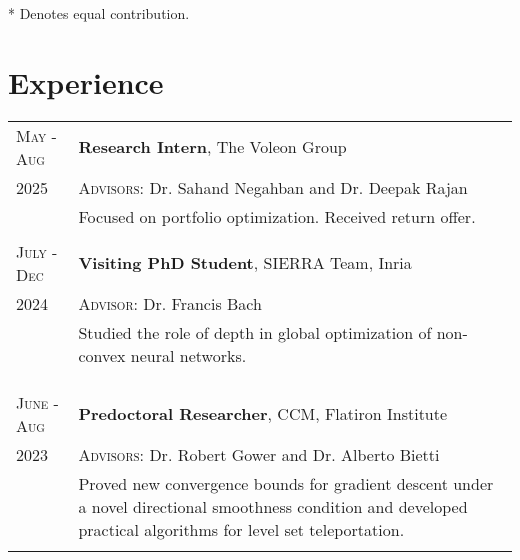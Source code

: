 \documentclass[10pt]{article}
\newcommand{\spacing}{\vspace{0.5cm}}
\begin{document}
* Denotes equal contribution.

\spacing

\section{Experience}
\begin{longtable}
    {R{1.8cm}|L{11.8cm}}
    \textsc{May - Aug} & \textbf{Research Intern}, The Voleon Group                                                  \\
    2025                &  \textsc{Advisors:} Dr. Sahand Negahban and Dr. Deepak Rajan                                                                                                            \\                  & {\small Focused on portfolio optimization. Received return offer.}                                                                                          \\  \\
    \textsc{July - Dec} & \textbf{Visiting PhD Student}, SIERRA Team, Inria                                                  \\
    2024                & \textsc{Advisor:}
    Dr.
    Francis Bach                                                                                                             \\                  & {\small Studied the role of depth in global optimization
    of non-convex neural networks.}                                                                                          \\ \\ \\ \\
    \textsc{June - Aug} & \textbf{Predoctoral Researcher}, CCM, Flatiron Institute                                           \\
    2023                & \textsc{Advisors:}
    Dr.
    Robert Gower and Dr.
    Alberto Bietti                                                                                                           \\                  & {\small Proved new convergence bounds for gradient descent
                               under a novel directional smoothness condition and developed practical
                               algorithms for level set teleportation.
    }                                                                                                                        \\  \\

\end{longtable}
\end{document}
